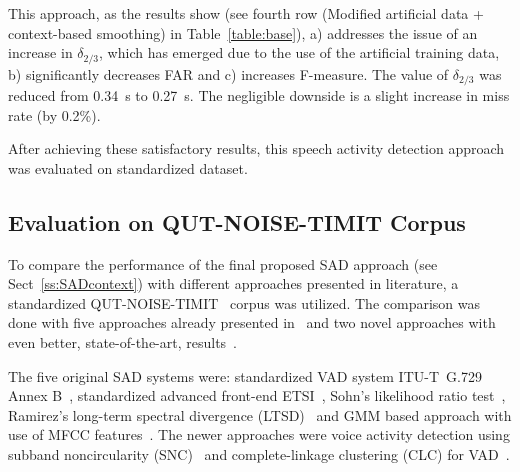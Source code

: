 \documentclass[FM,noheader,EN,bwtitles]{tulthesis}
\begin{document}
This approach, as the results show (see fourth row (Modified artificial data + context-based smoothing) in Table~\ref{table:base}), a) addresses the issue of an increase in $\delta_{2/3}$, which has emerged due to the use of the artificial training data, b) significantly decreases FAR and c) increases F-measure.
The value of $\delta_{2/3}$ was reduced from 0.34~s to 0.27~s.
The negligible downside is a slight increase in miss rate (by 0.2\%).

After achieving these satisfactory results, this speech activity detection approach was evaluated on standardized dataset.

\subsection{Evaluation on QUT-NOISE-TIMIT Corpus} 
\label{ss:SADqut}

To compare the performance of the final proposed SAD approach (see Sect~\ref{ss:SADcontext}) with different approaches presented in literature, a standardized QUT-NOISE-TIMIT~\parencite{DBLP:conf/interspeech/DeanSVM10} corpus was utilized.
The comparison was done with five approaches already presented in~\parencite{DBLP:conf/interspeech/DeanSVM10} and two novel approaches with even better, state-of-the-art, results~\parencite{DBLP:conf/icassp/WisdomOAP15, DBLP:conf/interspeech/GhaemmaghamiDKS15}.


The five original SAD systems were: standardized VAD system ITU-T~G.729 Annex B~\parencite{qut-1}, standardized advanced front-end ETSI~\parencite{DBLP:conf/icassp/LiLWD04}, Sohn's likelihood ratio test~\parencite{DBLP:journals/spl/SohnKS99}, Ramirez's long-term spectral divergence (LTSD)~\parencite{DBLP:journals/speech/RamirezSBTR04} and GMM based approach with use of MFCC features~\parencite{DBLP:conf/interspeech/DeanSVM10}.
The newer approaches were voice activity detection using subband noncircularity (SNC)~\parencite{DBLP:conf/icassp/WisdomOAP15} and complete-linkage clustering (CLC) for VAD~\parencite{DBLP:conf/interspeech/GhaemmaghamiDKS15}.
\end{document}
